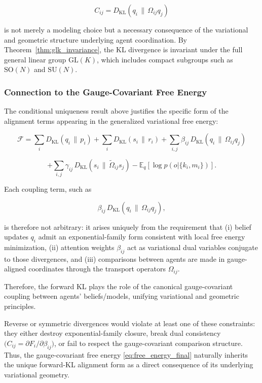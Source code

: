 \documentclass[twoside,11pt]{article}
\begin{document}
\[
\boxed{
C_{ij}=D_{\mathrm{KL}}(q_i \,\|\, \Omega_{ij} q_j)}
\]

is not merely a modeling choice but a necessary consequence of the variational and geometric structure underlying agent coordination. By Theorem~\ref{thm:glk_invariance}, the KL divergence is invariant under the full general linear group $\mathrm{GL}(K)$, which includes compact subgroups such as $\mathrm{SO}(N)$ and $\mathrm{SU}(N)$.

\subsubsection{Connection to the Gauge-Covariant Free Energy}
The conditional uniqueness result above justifies the specific form of the alignment terms appearing in the generalized variational free energy:

$$
\mathcal{F}
=\sum_i D_{\mathrm{KL}}(q_i \,\|\, p_i)
+ \sum_i D_{\mathrm{KL}}(s_i \,\|\, r_i)
+ \sum_{i,j}\beta_{ij}\,D_{\mathrm{KL}}(q_i \,\|\, \Omega_{ij} q_j)
$$

$$
+ \sum_{i,j}\gamma_{ij}\,D_{\mathrm{KL}}(s_i \,\|\, \tilde{\Omega}_{ij}s_j)- \mathbb{E}_q[\log p(o|\{k_i,m_i\})].
$$

Each coupling term, such as

$$
\beta_{ij}\,D_{\mathrm{KL}}(q_i \,\|\, \Omega_{ij} q_j),
$$

is therefore not arbitrary: it arises uniquely from the requirement that (i) belief updates $q_i$ admit an exponential-family form consistent with local free energy minimization, (ii) attention weights $\beta_{ij}$ act as variational dual variables conjugate to those divergences, and (iii) comparisons between agents are made in gauge-aligned coordinates through the transport operators $\Omega_{ij}$.

Therefore, the forward KL plays the role of the canonical gauge-covariant coupling between agents' beliefs/models, unifying variational and geometric principles.

Reverse or symmetric divergences would violate at least one of these constraints: they either destroy exponential-family closure, break dual consistency $\big(C_{ij} = \partial F_i / \partial \beta_{ij}\big)$, or fail to respect the gauge-covariant comparison structure. Thus, the gauge-covariant free energy \eqref{eq:free_energy_final} naturally inherits the unique forward-KL alignment form as a direct consequence of its underlying variational geometry.
\end{document}
